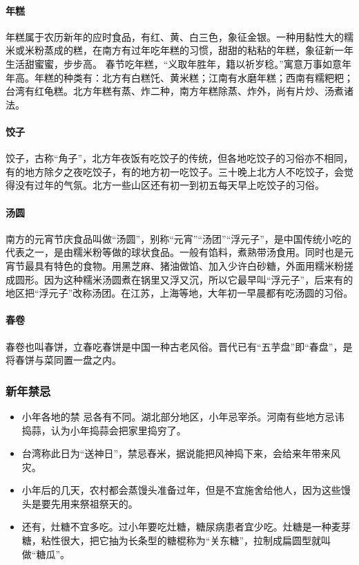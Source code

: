 \paragraph{年糕}
年糕属于农历新年的应时食品，有红、黄、白三色，象征金银。一种用黏性大的糯米或米粉蒸成的糕，在南方有过年吃年糕的习惯，甜甜的粘粘的年糕，象征新一年生活甜蜜蜜，步步高。
春节吃年糕，“义取年胜年，籍以祈岁稔。”寓意万事如意年年高。年糕的种类有：北方有白糕饦、黄米糕；江南有水磨年糕；西南有糯粑粑；台湾有红龟糕。北方年糕有蒸、炸二种，南方年糕除蒸、炸外，尚有片炒、汤煮诸法。 

\paragraph{饺子}
饺子，古称“角子”，北方年夜饭有吃饺子的传统，但各地吃饺子的习俗亦不相同，有的地方除夕之夜吃饺子，有的地方初一吃饺子。三十晚上北方人不吃饺子，会觉得没有过年的气氛。北方一些山区还有初一到初五每天早上吃饺子的习俗。

\paragraph{汤圆}
南方的元宵节庆食品叫做“汤圆”，别称“元宵”“汤团”“浮元子”，是中国传统小吃的代表之一，是由糯米粉等做的球状食品。一般有馅料，煮熟带汤食用。同时也是元宵节最具有特色的食物。用黑芝麻、猪油做馅、加入少许白砂糖，外面用糯米粉搓成圆形。因为这种糯米汤圆煮在锅里又浮又沉，所以它最早叫“浮元子”，后来有的地区把“浮元子”改称汤团。在江苏，上海等地，大年初一早晨都有吃汤圆的习俗。

\paragraph{春卷}
春卷也叫春饼，立春吃春饼是中国一种古老风俗。晋代已有“五芋盘”即“春盘”，是将春饼与菜同置一盘之内。

\subsubsection{新年禁忌}
\begin{itemize}
\item 
小年各地的禁 忌各有不同。湖北部分地区，小年忌宰杀。河南有些地方忌讳捣蒜，认为小年捣蒜会把家里捣穷了。
\item
台湾称此日为“送神日”，禁忌舂米，据说能把风神捣下来，会给来年带来风灾。
\item 
小年后的几天，农村都会蒸馒头准备过年，但是不宜施舍给他人，因为这些馒头是要先用来祭祖祭天的。
\item 
还有，灶糖不宜多吃。过小年要吃灶糖，糖尿病患者宜少吃。灶糖是一种麦芽糖，粘性很大，把它抽为长条型的糖棍称为“关东糖”，拉制成扁圆型就叫做“糖瓜”。
\end{itemize}